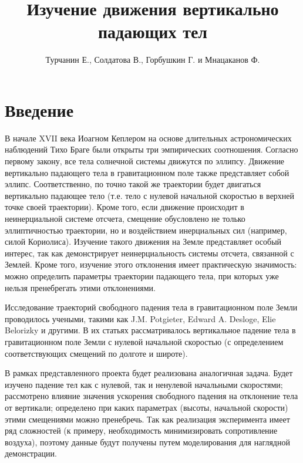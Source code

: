 \documentclass[hoptionsi, twocolumn]{revtex4-2}
\title{Изучение движения вертикально падающих тел}
\begin{document}
\author{Турчанин Е., Солдатова В., Горбушкин Г. и Мнацаканов Ф.}

\maketitle

\section{Введение}
В начале XVII века Иоагном Кеплером на основе длительных астрономических наблюдений Тихо Браге были открыты три эмпирических соотношения. Согласно первому закону, все тела солнечной системы движутся по эллипсу. Движение вертикально падающего тела в гравитационном поле также представляет собой эллипс. Соответственно, по точно такой же траектории будет двигаться вертикально падающее тело (т.е. тело с нулевой начальной скоростью в верхней точке своей траектории).
Кроме того, если движение происходит в неинерциальной системе отсчета, смещение обусловлено не только эллиптичностью траектории, но и воздействием инерциальных сил (например, силой Кориолиса). Изучение такого движения на Земле представляет особый интерес, так как демонстрирует неинерциальность системы отсчета, связанной с Землей. Кроме того, изучение этого отклонения имеет практическую значимость: можно определить параметры траектории падающего тела, при которых уже нельзя пренебрегать этими отклонениями.

Исследование траекторий свободного падения тела в гравитационном поле Земли проводилось учеными, такими как J.M. Potgieter, Edward A. Desloge, Elie Belorizky и другими. В их статьях рассматривалось вертикальное падение тела в гравитационном поле Земли с нулевой начальной скоростью (с определением соответствующих смещений по долготе и широте).

В рамках представленного проекта будет реализована аналогичная задача. Будет изучено падение тел как с нулевой, так и ненулевой начальными скоростями; рассмотрено влияние значения ускорения свободного падения на отклонение тела от вертикали; определено при каких параметрах (высоты, начальной скорости) этими смещениями можно пренебречь. Так как реализация эксперимента имеет ряд сложностей (к примеру, необходимость минимизировать сопротивление воздуха), поэтому данные будут получены путем моделирования для наглядной демонстрации.
\end{document}
